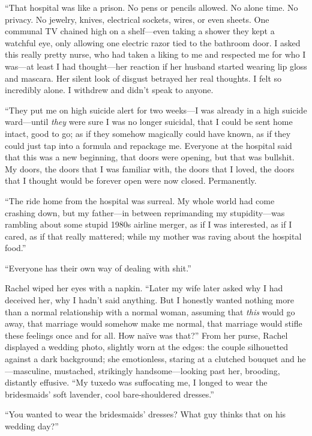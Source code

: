 ``That hospital was like a prison. No pens or pencils allowed. No alone
time. No privacy. No jewelry, knives, electrical sockets, wires, or even
sheets. One communal TV chained high on a shelf---even taking a shower
they kept a watchful eye, only allowing one electric razor tied to the
bathroom door. I asked this really pretty nurse, who had taken a liking
to me and respected me for who I was---at least I had thought---her
reaction if her husband started wearing lip gloss and mascara. Her
silent look of disgust betrayed her real thoughts. I felt so incredibly
alone. I withdrew and didn't speak to anyone.

``They put me on high suicide alert for two weeks---I was already in a
high suicide ward---until \emph{they} were sure I was no longer
suicidal, that I could be sent home intact, good to go; as if they
somehow magically could have known, as if they could just tap into a
formula and repackage me. Everyone at the hospital said that this was a
new beginning, that doors were opening, but that was bullshit. My doors,
the doors that I was familiar with, the doors that I loved, the doors
that I thought would be forever open were now closed. Permanently.

``The ride home from the hospital was surreal. My whole world had come
crashing down, but my father---in between reprimanding my
stupidity---was rambling about some stupid 1980s airline merger, as if I
was interested, as if I cared, as if that really mattered; while my
mother was raving about the hospital food.''

``Everyone has their own way of dealing with shit.''

Rachel wiped her eyes with a napkin. ``Later my wife later asked why I
had deceived her, why I hadn't said anything. But I honestly wanted
nothing more than a normal relationship with a normal woman, assuming
that \emph{this} would go away, that marriage would somehow make me
normal, that marriage would stifle these feelings once and for all. How
naïve was that?'' From her purse, Rachel displayed a wedding photo,
slightly worn at the edges: the couple silhouetted against a dark
background; she emotionless, staring at a clutched bouquet and
he---masculine, mustached, strikingly handsome---looking past her,
brooding, distantly effusive. ``My tuxedo was suffocating me, I longed
to wear the bridesmaids' soft lavender, cool bare-shouldered dresses.''

``You wanted to wear the bridesmaids' dresses? What guy thinks that on
his wedding day?''

